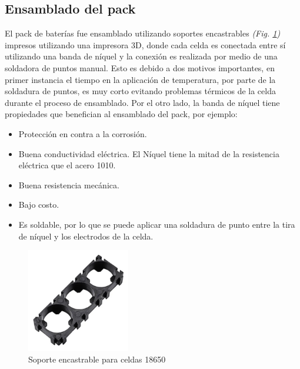 \documentclass[10pt, a4paper]{report}
\begin{document}
\subsection{Ensamblado del pack}

El pack de bater\'ias fue ensamblado utilizando soportes encastrables
\emph{(Fig. \ref{soporte_18650})} impresos utilizando una impresora 3D, donde
cada celda es conectada entre s\'i utilizando una banda de níquel y la
conexi\'on es realizada por medio de una soldadora de puntos manual. Esto es
debido a dos motivos importantes, en primer instancia el tiempo en la
aplicaci\'on de temperatura, por parte de la soldadura de puntos, es muy corto
evitando problemas t\'ermicos de la celda durante el proceso de ensamblado. Por
el otro lado, la banda de níquel tiene propiedades que benefician al ensamblado
del pack, por ejemplo:

\begin{itemize}
    \item Protecci\'on en contra a la corrosi\'on.
    \item Buena conductividad el\'ectrica. El N\'iquel tiene la mitad de la
        resistencia el\'ectrica que el acero 1010.
    \item Buena resistencia mec\'anica.
    \item Bajo costo.
    \item Es soldable, por lo que se puede aplicar una soldadura de punto entre
        la tira de n\'iquel y los electrodos de la celda.
\end{itemize}

\begin{figure}[h!]
    \begin{center}
        \includegraphics[width=0.4\textwidth]{soporte_18650.png}
        \caption{Soporte encastrable para celdas 18650}
        \label{soporte_18650}
    \end{center}
\end{figure}
\FloatBarrier
\end{document}
